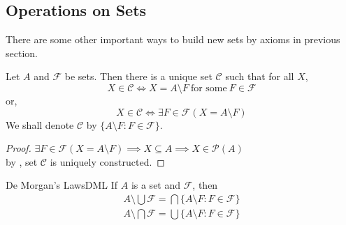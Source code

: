 \newpage

\subsection{Operations on Sets}

There are some other important ways to build new sets by axioms in previous section.

\begin{lemma}{}{}
    Let $A$ and $\mathcal{F}$ be sets. Then there is a unique set $\mathcal{C}$ such that for all $X$,
    \begin{equation*}
        X \in \mathcal{C} \iff X = A \setminus F \ \text{for some}\ F \in \mathcal{F}
    \end{equation*}
    or,
    \begin{equation*}
        X \in \mathcal{C} \iff \exists F \in \mathcal{F}(X = A \setminus F) 
    \end{equation*}
    We shall denote $\mathcal{C}$ by $\{A \setminus F: F \in \mathcal{F}\}$.
\end{lemma}

\begin{proof}
    $\exists F \in \mathcal{F}(X = A \setminus F) \implies X \subseteq A \implies X \in \mathcal{P}(A)$\\
    by , set $\mathcal{C}$ is uniquely constructed.

    
\end{proof}

\begin{theorem}{De Morgan's Laws}{DML}
    If $A$ is a set and $\mathcal{F}$, then
    \begin{eqnarray*}
        A \setminus \bigcup \mathcal{F} = \bigcap \{A \setminus F: F \in \mathcal{F}\}\\
        A \setminus \bigcap \mathcal{F} = \bigcup \{A \setminus F: F \in \mathcal{F}\}
    \end{eqnarray*}
\end{theorem}

